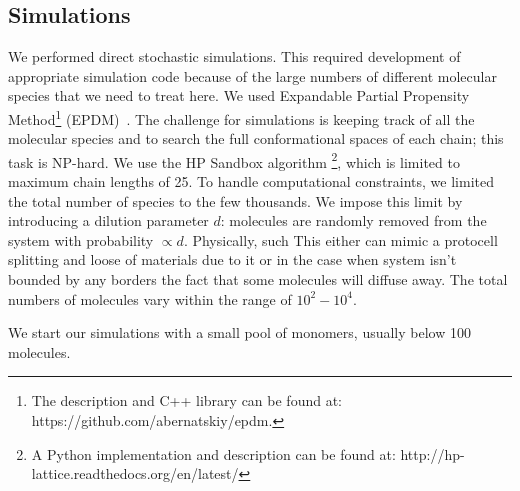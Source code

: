 \documentclass[journal=jacsat,manuscript=article,layout=twocolumn]{achemso}
\begin{document}
\subsection{Simulations\label{sec:mat-sim}}
We performed direct stochastic simulations.  This required development of appropriate simulation 
code because of the large numbers of different molecular species that we need to treat here.  We 
used Expandable Partial Propensity Method\footnote{The description and 
C++ library can be found at: https://github.com/abernatskiy/epdm.} (EPDM)~\cite{Guseva2016b}. The 
challenge for simulations is 
keeping track of all the molecular species and to search the full conformational spaces of each 
chain; this task is NP-hard.  We use the HP Sandbox 
algorithm\cite{lau1989lattice,Dill2008} \footnote{A Python implementation and description can be 
found at: http://hp-lattice.readthedocs.org/en/latest/}, which is 
limited to maximum chain lengths 
of 25.  To handle computational constraints, we 
limited the total number of species to the few 
thousands.  We impose this limit by introducing a dilution parameter $d$: molecules are randomly 
removed from the system with probability $\propto d$.  Physically, such This either can mimic a 
protocell splitting and loose of materials due to it or in the case when system isn't bounded by any 
borders the fact that some molecules will diffuse away. The total numbers of molecules vary within 
the range of $10^2-10^4$.

We start our simulations with a small pool of monomers, usually below 100 molecules. 
\end{document}
